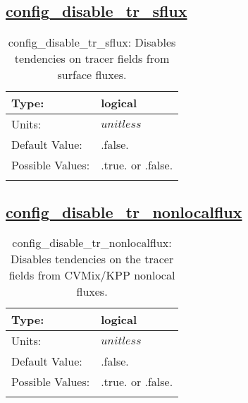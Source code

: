 \subsection[config\_disable\_tr\_sflux]{\hyperref[sec:nm_tab_debug]{config\_disable\_tr\_sflux}}
\label{subsec:nm_sec_config_disable_tr_sflux}
\begin{center}
\begin{longtable}{| p{2.0in} || p{4.0in} |}
    \hline
    Type: & logical \\
    \hline
    Units: & $unitless$ \\
    \hline
    Default Value: & .false. \\
    \hline
    Possible Values: & .true. or .false. \\
    \hline
    \caption{config\_disable\_tr\_sflux: Disables tendencies on tracer fields from surface fluxes.}
\end{longtable}
\end{center}
\subsection[config\_disable\_tr\_nonlocalflux]{\hyperref[sec:nm_tab_debug]{config\_disable\_tr\_nonlocalflux}}
\label{subsec:nm_sec_config_disable_tr_nonlocalflux}
\begin{center}
\begin{longtable}{| p{2.0in} || p{4.0in} |}
    \hline
    Type: & logical \\
    \hline
    Units: & $unitless$ \\
    \hline
    Default Value: & .false. \\
    \hline
    Possible Values: & .true. or .false. \\
    \hline
    \caption{config\_disable\_tr\_nonlocalflux: Disables tendencies on the tracer fields from CVMix/KPP nonlocal fluxes.}
\end{longtable}
\end{center}
